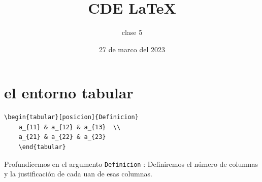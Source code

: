 \documentclass[]{article}
\title{CDE \LaTeX }
\author{clase 5}
\date{27 de marco del 2023}
\begin{document}
	\maketitle
	\begin{abstract}
	\lipsum[3-4]
	\end{abstract}

\section{el entorno tabular}
\begin{verbatim}
\begin{tabular}[posicion]{Definicion}
	a_{11} & a_{12} & a_{13}  \\
	a_{21} & a_{22} & a_{23}
	\end{tabular}
\end{verbatim}

Profundicemos en el argumento \verb*|Definicion| :
Definiremos el número de columnas y la justificación de cada uan de esas columnas.
\end{document}
